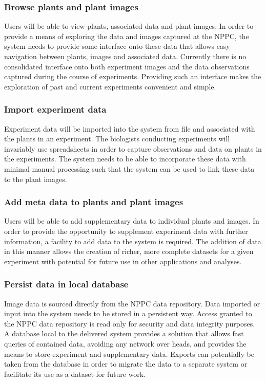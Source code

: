  
\subsubsection{Browse plants and plant images}  Users will be able to view plants, associated data and plant images. In order to provide a means of exploring the data and images captured at the NPPC, the system needs to provide some interface onto these data that allows easy navigation between plants, images and associated data. Currently there is no consolidated interface onto both experiment images and the data observations captured during the course of experiments. Providing such an interface makes the exploration of past and current experiments convenient and simple.

\subsubsection{Import experiment data}  Experiment data will be imported into the system from file and associated with the plants in an experiment. The biologists conducting experiments will invariably use spreadsheets in order to capture observations and data on plants in the experiments. The system needs to be able to incorporate these data with minimal manual processing such that the system can be used to link these data to the plant images. 

\subsubsection{Add meta data to plants and plant images}  Users will be able to add supplementary data to individual plants and images. In order to provide the opportunity to supplement experiment data with further information, a facility to add data to the system is required. The addition of data in this manner allows the creation of richer, more complete datasets for a given experiment with potential for future use in other applications and analyses. 

\subsubsection{Persist data in local database} Image data is sourced directly from the NPPC data repository. Data imported or input into the system needs to be stored in a persistent way. Access granted to the NPPC data repository is read only for security and data integrity purposes. A database local to the delivered system provides a solution that allows fast queries of contained data, avoiding any network over heads, and provides the means to store experiment and supplementary data. Exports can potentially be taken from the database in order to migrate the data to a separate system or facilitate its use as a dataset for future work. 

